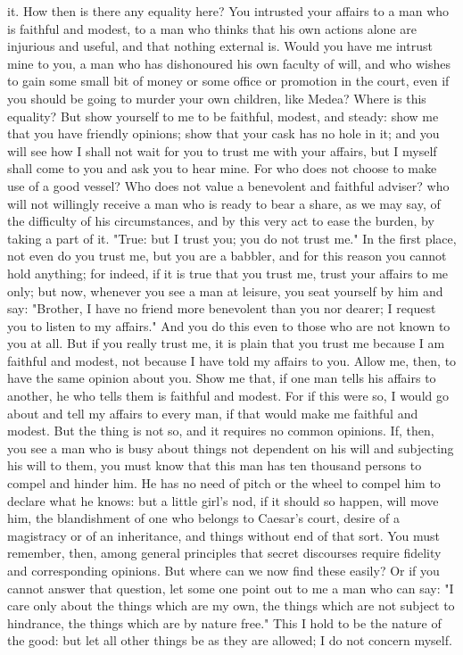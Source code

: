 \documentclass[a4paper]{article}
\begin{document}
it. How then is there any equality here? You intrusted your affairs to a man
who is faithful and modest, to a man who thinks that his own actions alone are
injurious and useful, and that nothing external is. Would you have me intrust
mine to you, a man who has dishonoured his own faculty of will, and who wishes
to gain some small bit of money or some office or promotion in the court, even
if you should be going to murder your own children, like Medea? Where is this
equality? But show yourself to me to be faithful, modest, and steady: show me
that you have friendly opinions; show that your cask has no hole in it; and you
will see how I shall not wait for you to trust me with your affairs, but I
myself shall come to you and ask you to hear mine. For who does not choose to
make use of a good vessel? Who does not value a benevolent and faithful
adviser? who will not willingly receive a man who is ready to bear a share, as
we may say, of the difficulty of his circumstances, and by this very act to
ease the burden, by taking a part of it.
    "True: but I trust you; you do not trust me." In the first place, not even
do you trust me, but you are a babbler, and for this reason you cannot hold
anything; for indeed, if it is true that you trust me, trust your affairs to me
only; but now, whenever you see a man at leisure, you seat yourself by him and
say: "Brother, I have no friend more benevolent than you nor dearer; I request
you to listen to my affairs." And you do this even to those who are not known
to you at all. But if you really trust me, it is plain that you trust me
because I am faithful and modest, not because I have told my affairs to you.
Allow me, then, to have the same opinion about you. Show me that, if one man
tells his affairs to another, he who tells them is faithful and modest. For if
this were so, I would go about and tell my affairs to every man, if that would
make me faithful and modest. But the thing is not so, and it requires no common
opinions. If, then, you see a man who is busy about things not dependent on his
will and subjecting his will to them, you must know that this man has ten
thousand persons to compel and hinder him. He has no need of pitch or the wheel
to compel him to declare what he knows: but a little girl's nod, if it should
so happen, will move him, the blandishment of one who belongs to Caesar's
court, desire of a magistracy or of an inheritance, and things without end of
that sort. You must remember, then, among general principles that secret
discourses require fidelity and corresponding opinions. But where can we now
find these easily? Or if you cannot answer that question, let some one point
out to me a man who can say: "I care only about the things which are my own,
the things which are not subject to hindrance, the things which are by nature
free." This I hold to be the nature of the good: but let all other things be as
they are allowed; I do not concern myself.
\end{document}
